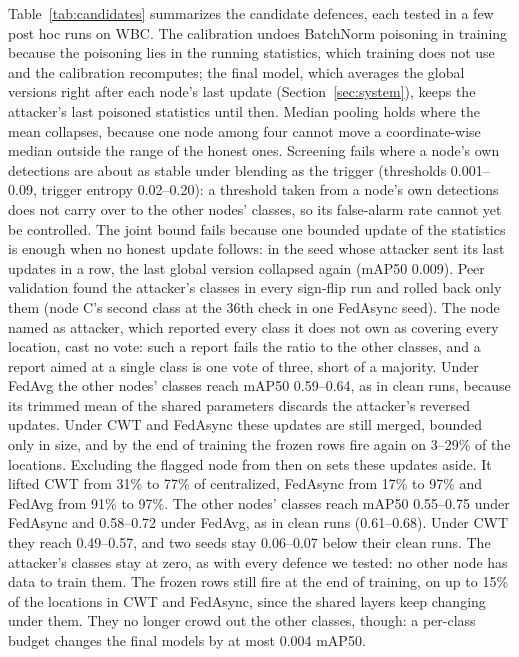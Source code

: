 \documentclass[pdflatex,sn-mathphys-num]{sn-jnl}
\begin{document}
Table~\ref{tab:candidates} summarizes the candidate defences, each tested in a few post hoc runs on WBC. The calibration undoes BatchNorm poisoning in training because the poisoning lies in the running statistics, which training does not use and the calibration recomputes; the final model, which averages the global versions right after each node's last update (Section~\ref{sec:system}), keeps the attacker's last poisoned statistics until then. Median pooling holds where the mean collapses, because one node among four cannot move a coordinate-wise median outside the range of the honest ones. Screening fails where a node's own detections are about as stable under blending as the trigger (thresholds 0.001--0.09, trigger entropy 0.02--0.20): a threshold taken from a node's own detections does not carry over to the other nodes' classes, so its false-alarm rate cannot yet be controlled. The joint bound fails because one bounded update of the statistics is enough when no honest update follows: in the seed whose attacker sent its last updates in a row, the last global version collapsed again (mAP50 0.009). Peer validation found the attacker's classes in every sign-flip run and rolled back only them (node C's second class at the 36th check in one FedAsync seed). The node named as attacker, which reported every class it does not own as covering every location, cast no vote: such a report fails the ratio to the other classes, and a report aimed at a single class is one vote of three, short of a majority. Under FedAvg the other nodes' classes reach mAP50 0.59--0.64, as in clean runs, because its trimmed mean of the shared parameters discards the attacker's reversed updates. Under CWT and FedAsync these updates are still merged, bounded only in size, and by the end of training the frozen rows fire again on 3--29\% of the locations. Excluding the flagged node from then on sets these updates aside. It lifted CWT from 31\% to 77\% of centralized, FedAsync from 17\% to 97\% and FedAvg from 91\% to 97\%. The other nodes' classes reach mAP50 0.55--0.75 under FedAsync and 0.58--0.72 under FedAvg, as in clean runs (0.61--0.68). Under CWT they reach 0.49--0.57, and two seeds stay 0.06--0.07 below their clean runs. The attacker's classes stay at zero, as with every defence we tested: no other node has data to train them. The frozen rows still fire at the end of training, on up to 15\% of the locations in CWT and FedAsync, since the shared layers keep changing under them. They no longer crowd out the other classes, though: a per-class budget changes the final models by at most 0.004 mAP50.
\end{document}
